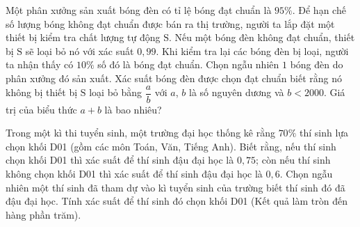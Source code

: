 \begin{bt}%
	Một phân xưởng sản xuất bóng đèn có tỉ lệ bóng đạt chuẩn là $95 \%$. Để hạn chế số lượng bóng  không đạt chuẩn được bán ra thị trường, người ta lắp đặt một thiết bị kiểm tra chất lượng tự động $\mathrm{S}$. Nếu một bóng đèn không đạt chuẩn, thiết bị $\mathrm{S}$ sẽ loại bỏ nó với xác suất $0{,}99$. Khi kiểm tra lại các bóng đèn bị loại, người ta nhận thấy có $10 \%$ số đó là bóng đạt chuẩn. Chọn ngẫu nhiên $1$ bóng đèn do phân xưởng đó sản xuất. Xác suất bóng đèn được chọn đạt chuẩn biết rằng nó không bị thiết bị $\mathrm{S}$ loại bỏ bằng $\dfrac{a}{b}$ với $a$, $b$ là số nguyên dương và $b<2000$. Giá trị của biểu thức $a+b$ là bao nhiêu?
\end{bt}

\begin{bt}%
	Trong một kì thi tuyển sinh, một trường đại học thống kê rằng $70\%$ thí sinh lựa chọn khối D01 (gồm các môn Toán, Văn, Tiếng Anh). Biết rằng, nếu thí sinh chọn khối D01 thì xác suất để thí sinh đậu đại học là $0{,}75$;  còn nếu thí sinh không chọn khối D01 thì xác suất để thí sinh đậu đại học là $0{,}6$. Chọn ngẫu nhiên một thí sinh đã tham dự vào kì tuyển sinh của trường biết thí sinh đó đã đậu đại học. Tính xác suất để thí sinh đó chọn khối D01 (Kết quả làm tròn đến hàng phần trăm).
\end{bt}

